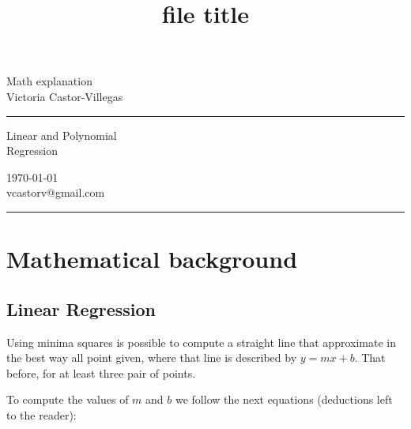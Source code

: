 {\setlength{\parindent}{0pt}
\title{file title} %
\fancyhead[C]{}
\begin{minipage}{0.295\textwidth} %
\raggedright
Math explanation\\ %
\footnotesize %
Victoria Castor-Villegas %
\medskip\hrule
\end{minipage}
\begin{minipage}{0.4\textwidth} %
\centering 
\large %
Linear and Polynomial\\ %
\normalsize %
Regression\\ %
\end{minipage}
\begin{minipage}{0.295\textwidth} %
\raggedleft
\today\\ %
\footnotesize %
vcastorv@gmail.com %
\medskip\hrule
\end{minipage}
}

\section{\textbf{Mathematical background}}

\subsection{Linear Regression}

Using minima squares is possible to compute a straight line that approximate in the best way all
point given, where that line is described by $y=mx+b$. That before, for at least
three pair of points.

To compute the values of $m$ and $b$ we follow the next equations (deductions left to
the reader):

